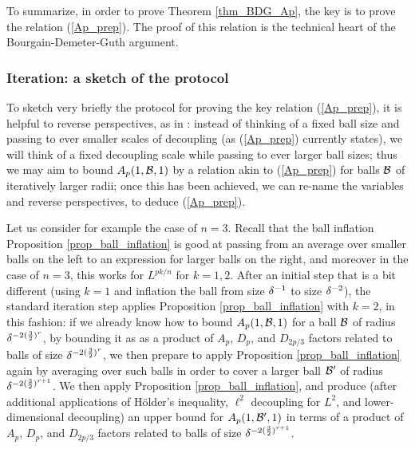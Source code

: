 \documentclass[brochure,english,12pt]{bourbaki}%
\begin{document}
To summarize, in order to prove Theorem \ref{thm_BDG_Ap}, the key is to prove the relation (\ref{Ap_prep}). 
The proof of this relation is the technical heart of the Bourgain-Demeter-Guth argument.

\subsubsection{Iteration: a sketch of the protocol}\label{sec_iteration_sketch}
To sketch very briefly the protocol for proving the key relation (\ref{Ap_prep}), it is helpful to reverse perspectives, as in \cite[\S 8]{BDG16}: instead of thinking of a fixed ball size and passing to ever smaller scales of decoupling (as (\ref{Ap_prep}) currently states), we will think of a fixed decoupling scale while passing to ever larger ball sizes; thus we may aim to bound $A_p(1,\mathcal{B},1)$ by a relation akin to (\ref{Ap_prep}) for balls $\mathcal{B}$ of iteratively larger radii; once this has been achieved, we can re-name the variables and reverse perspectives, to deduce (\ref{Ap_prep}).  

Let us consider for example the case of $n=3$. Recall that the ball inflation Proposition \ref{prop_ball_inflation} is good at passing from an average over smaller balls on the left to an expression for larger balls on the right, and moreover in the case of $n=3$, this works for $L^{pk/n}$ for $k=1,2$. After an initial step that is a bit different (using $k=1$ and inflation the ball from size $\delta^{-1}$ to size $\delta^{-2}$), the standard iteration step applies Proposition \ref{prop_ball_inflation} with $k=2$, in this fashion: if we already know how to bound $A_p(1,\mathcal{B},1)$ for a ball $\mathcal{B}$ of radius $\delta^{-2(\frac{3}{2})^r}$, by bounding it as as a product of $A_p$, $D_p$, and $D_{2p/3}$ factors related to balls of size $\delta^{-2(\frac{3}{2})^r}$, we then prepare to apply Proposition \ref{prop_ball_inflation} again by averaging over such balls in order to cover a larger ball $\mathcal{B}'$ of radius $\delta^{-2(\frac{3}{2})^{r+1}}$. We then apply Proposition \ref{prop_ball_inflation}, and produce (after additional applications of H\"{o}lder's inequality, $\ell^2$ decoupling for $L^2$, and lower-dimensional decoupling) an upper bound for $A_p(1,\mathcal{B}',1)$  in terms of a product of $A_p$, $D_p$, and $D_{2p/3}$ factors related to balls of size $\delta^{-2(\frac{3}{2})^{r+1}}$. 
\end{document}
